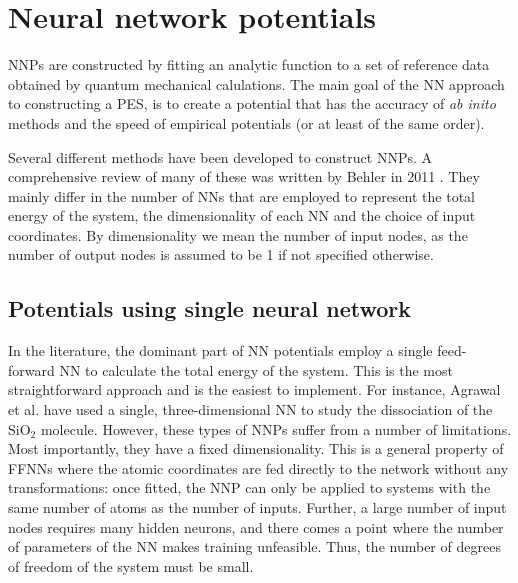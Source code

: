 \documentclass[twoside,english]{uiofysmaster}
\begin{document}
\section{Neural network potentials}
NNPs are constructed by fitting an analytic function to a set of reference data
obtained by quantum mechanical calulations.
The main goal of the NN approach to constructing a PES, is to create a potential that has the accuracy of \textit{ab inito}
methods and the speed of empirical potentials (or at least of the same order).

Several different methods have been developed to construct NNPs. A comprehensive review of many of these 
was written by Behler in 2011 \cite{Behler11general}. They mainly differ in the number of NNs that are employed 
to represent the total energy of the system, the dimensionality of each NN and the choice of input coordinates. 
By dimensionality we mean the number of input nodes, as the number of output nodes is assumed to be 1 if not specified otherwise. 

\subsection{Potentials using single neural network}
In the literature, the dominant part of NN potentials employ a single feed-forward NN to calculate the total energy of the system.
This is the most straightforward approach and is the easiest to implement.
For instance, Agrawal et al. \cite{Agrawal06} have used a single, three-dimensional NN to study the dissociation of the 
$\mathrm{SiO}_2$ molecule. However, these types of NNPs suffer from a number of limitations. Most importantly, 
they have a fixed dimensionality. This is a general property of FFNNs where the atomic coordinates are fed directly 
to the network without any transformations: once fitted, the NNP can only be applied to systems with the same number of atoms
as the number of inputs. Further, a large number of input nodes requires many hidden neurons, and there comes a point 
where the number of parameters of the NN makes training unfeasible. Thus, the number of degrees of freedom of the system 
must be small. 
\end{document}
